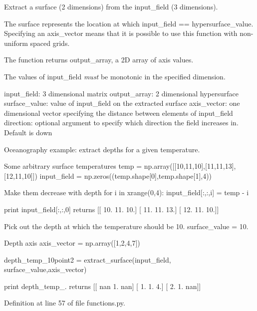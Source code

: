 Extract a surface (2 dimensions) from the input\+\_\+field (3 dimensions). 

The surface represents the location at which input\+\_\+field == hypersurface\+\_\+value. Specifying an axis\+\_\+vector means that it is possible to use this function with non-\/uniform spaced grids.

The function returns output\+\_\+array, a 2\+D array of axis values.

The values of input\+\_\+field {\itshape must} be monotonic in the specified dimension.

input\+\_\+field\+: 3 dimensional matrix output\+\_\+array\+: 2 dimensional hypersurface surface\+\_\+value\+: value of input\+\_\+field on the extracted surface axis\+\_\+vector\+: one dimensional vector specifying the distance between elements of input\+\_\+field direction\+: optional argument to specify which direction the field increases in. Default is down

Oceanography example\+: extract depths for a given temperature.

Some arbitrary surface temperatures temp = np.\+array(\mbox{[}\mbox{[}10,11,10\mbox{]},\mbox{[}11,11,13\mbox{]},\mbox{[}12,11,10\mbox{]}\mbox{]}) input\+\_\+field = np.\+zeros((temp.\+shape\mbox{[}0\mbox{]},temp.\+shape\mbox{[}1\mbox{]},4))

Make them decrease with depth for i in xrange(0,4)\+: input\+\_\+field\mbox{[}\+:,\+:,i\mbox{]} = temp -\/ i

print input\+\_\+field\mbox{[}\+:,\+:,0\mbox{]} returns \mbox{[}\mbox{[} 10. 11. 10.\mbox{]} \mbox{[} 11. 11. 13.\mbox{]} \mbox{[} 12. 11. 10.\mbox{]}\mbox{]}

Pick out the depth at which the temperature should be 10. surface\+\_\+value = 10.

Depth axis axis\+\_\+vector = np.\+array(\mbox{[}1,2,4,7\mbox{]})

depth\+\_\+temp\+\_\+10point2 = extract\+\_\+surface(input\+\_\+field, surface\+\_\+value,axis\+\_\+vector)

print depth\+\_\+temp\+\_. returns \mbox{[}\mbox{[} nan 1. nan\mbox{]} \mbox{[} 1. 1. 4.\mbox{]} \mbox{[} 2. 1. nan\mbox{]}\mbox{]} 

Definition at line 57 of file functions.\+py.

\hypertarget{namespacemitgcm_1_1functions_ab26c3c96d103e888d18a0378ebd78355}{}
